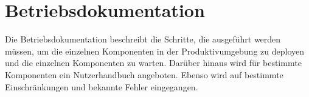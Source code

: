\chapter{Betriebsdokumentation}
Die Betriebsdokumentation beschreibt die Schritte, die ausgeführt werden müssen, um die einzelnen Komponenten in der Produktivumgebung zu deployen und die einzelnen Komponenten zu warten. Darüber hinaus wird für bestimmte Komponenten ein Nutzerhandbuch angeboten. Ebenso wird auf bestimmte Einschränkungen und bekannte Fehler eingegangen.



















 
